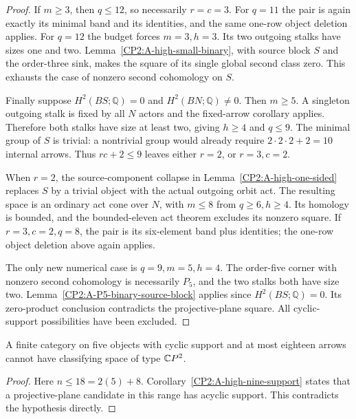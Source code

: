 \begin{proof}
If $m\ge3$, then $q\le12$, so necessarily $r=c=3$. For $q=11$
the pair is again exactly its minimal band and its identities,
and the same one-row object deletion applies. For $q=12$ the
budget forces $m=3,h=3$. Its two outgoing stalks have sizes one
and two. Lemma~\ref{CP2:A-high-small-binary}, with source block
$S$ and the order-three sink, makes the square of its single
global second class zero. This exhausts the case of nonzero
second cohomology on $S$.

Finally suppose $H^2(BS;\mathbb Q)=0$ and
$H^2(BN;\mathbb Q)\ne0$. Then $m\ge5$. A singleton outgoing
stalk is fixed by all $N$ actors and the fixed-arrow corollary
applies. Therefore both stalks have size at least two, giving
$h\ge4$ and $q\le9$. The minimal group of $S$ is trivial:
a nontrivial group would already require
$2\cdot2\cdot2+2=10$ internal arrows. Thus
$rc+2\le9$ leaves either $r=2$, or $r=3,c=2$.

When $r=2$, the source-component collapse in
Lemma~\ref{CP2:A-high-one-sided} replaces $S$ by a trivial
object with the actual outgoing orbit act. The resulting space
is an ordinary act cone over $N$, with $m\le8$ from
$q\ge6,h\ge4$. Its homology is bounded, and the bounded-eleven
act theorem excludes its nonzero square. If $r=3,c=2,q=8$,
the pair is its six-element band plus identities; the one-row
object deletion above again applies.

The only new numerical case is $q=9,m=5,h=4$. The order-five
corner with nonzero second cohomology is necessarily $P_5$,
and the two stalks both have size two. Lemma~\ref{CP2:A-P5-binary-source-block}
applies since $H^2(BS;\mathbb Q)=0$. Its zero-product conclusion
contradicts the projective-plane square. All cyclic-support
possibilities have been excluded.
\end{proof}

\begin{corollary}
\label{CP2:A-strong-five-eighteen}
A finite category on five objects with cyclic support and at
most eighteen arrows cannot have classifying space of type $\mathbb{C}P^2$.
\end{corollary}
\begin{proof}
Here $n\le18=2(5)+8$. Corollary~\ref{CP2:A-high-nine-support}
states that a projective-plane candidate in this range has acyclic
support. This contradicts the hypothesis directly.
\end{proof}
